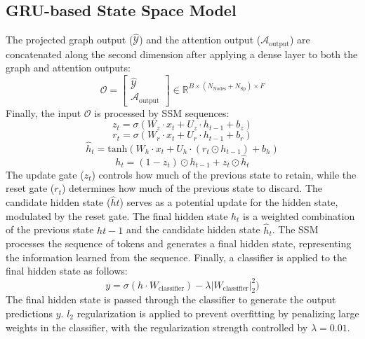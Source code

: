 \documentclass[journal]{IEEEtran}
\begin{document}
\subsection{GRU-based State Space Model}
The projected graph output ($\mathcal{\hat{Y}}$) and the attention output ($\mathcal{A}_{\text{output}}$) are concatenated along the second dimension after applying a dense layer to both the graph and attention outputs:
\begin{equation}
    \mathcal{O} = \begin{bmatrix}
        \mathcal{\hat{Y}} \\ 
        \mathcal{A}_{\text{output}}
\end{bmatrix} 
\in  \mathbb{R}^{B \times (N_{\text{Nodes}} + N_{\text{Sp}}) \times F} 
\end{equation}
Finally, the input $\mathcal{O}$ is processed by SSM sequences:
\begin{equation}
    z_t = \sigma(W_z \cdot x_t + U_z \cdot h_{t-1} + b_z)
\end{equation}
\begin{equation}
    r_t = \sigma(W_r \cdot x_t + U_r \cdot h_{t-1} + b_r)
\end{equation}
\begin{equation}
    \hat{h}_t  = \text{tanh} (W_h \cdot x_t + U_h \cdot (r_t \odot h_{t-1}) + b_h)
\end{equation}
\begin{equation}
    h_t = (1 - z_t) \odot h_{t-1} + z_t \odot \hat{h}_t
\end{equation}
The update gate ($z_t$) controls how much of the previous state to retain, while the reset gate ($r_t$) determines how much of the previous state to discard. The candidate hidden state ($\hat{h}t$) serves as a potential update for the hidden state, modulated by the reset gate. The final hidden state $h_t$ is a weighted combination of the previous state $h{t-1}$ and the candidate hidden state $\hat{h}_t$. The SSM processes the sequence of tokens and generates a final hidden state, representing the information learned from the sequence. Finally, a classifier is applied to the final hidden state as follows:
\begin{equation}
    y = \sigma(h \cdot W_{\text{classifier}}) - \lambda |W_{\text{classifier}}|_2^2)
\end{equation}
The final hidden state is passed through the classifier to generate the output predictions $y$. $l_2$ regularization is applied to prevent overfitting by penalizing large weights in the classifier, with the regularization strength controlled by $\lambda = 0.01$.
\end{document}
